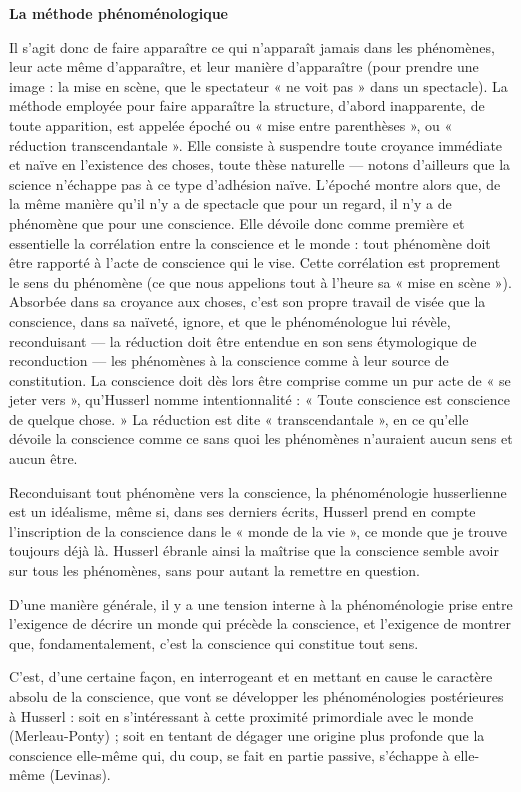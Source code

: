 \vspace{0.5cm}
{\bf La méthode phénoménologique}

Il s’agit donc de faire apparaître ce qui
n'apparaît jamais dans les phénomènes,
leur acte même d’apparaître, et leur
manière d'apparaître (pour prendre une
image : la mise en scène, que le spectateur
« ne voit pas » dans un spectacle).
La méthode employée pour faire apparaître
la structure, d’abord inapparente,
de toute apparition, est appelée époché
ou « mise entre parenthèses », ou
« réduction  transcendantale ». Elle
consiste à suspendre toute croyance
immédiate et naïve en l'existence des
choses, toute thèse naturelle — notons
d’ailleurs que la science n'échappe pas
à ce type d'adhésion naïve. L'époché
montre alors que, de la même manière
qu'il n’y a de spectacle que pour un
regard, il n’y a de phénomène que pour
une conscience. Elle dévoile donc
comme première et essentielle la corrélation
entre la conscience et le monde :
tout phénomène doit être rapporté à
l'acte de conscience qui le vise. Cette
corrélation est proprement le sens du
phénomène (ce que nous appelions tout
à l'heure sa « mise en scène »). Absorbée
dans sa croyance aux choses, c’est son
propre travail de visée que la
conscience, dans sa naïveté, ignore, et
que le phénoménologue lui révèle,
reconduisant — la réduction doit être
entendue en son sens étymologique de
reconduction — les phénomènes à la
conscience comme à leur source de
constitution. La conscience doit dès lors
être comprise comme un pur acte de « se
jeter vers », qu'Husserl nomme intentionnalité :
« Toute conscience est
conscience de quelque chose. » La
réduction est dite « transcendantale »,
en ce qu’elle dévoile la conscience
comme ce sans quoi les phénomènes
n'auraient aucun sens et aucun être.

Reconduisant tout phénomène vers la
conscience, la phénoménologie husserlienne
est un idéalisme, même si, dans
ses derniers écrits, Husserl prend en
compte l'inscription de la conscience
dans le « monde de la vie », ce monde
que je trouve toujours déjà là. Husserl
ébranle ainsi la maîtrise que la
conscience semble avoir sur tous les
phénomènes, sans pour autant la
remettre en question.

D'une manière générale, il y a une tension
interne à la phénoménologie prise
entre l'exigence de décrire un monde qui
précède la conscience, et l'exigence de
montrer que, fondamentalement, c’est la
conscience qui constitue tout sens.

C'est, d'une certaine façon, en interrogeant
et en mettant en cause le caractère
absolu de la conscience, que vont se
développer les phénoménologies postérieures
à Husserl : soit en s'intéressant
à cette proximité primordiale avec le
monde (Merleau-Ponty) ; soit en tentant
de dégager une origine plus profonde
que la conscience elle-même qui, du
coup, se fait en partie passive, s'échappe
à elle-même (Levinas).

